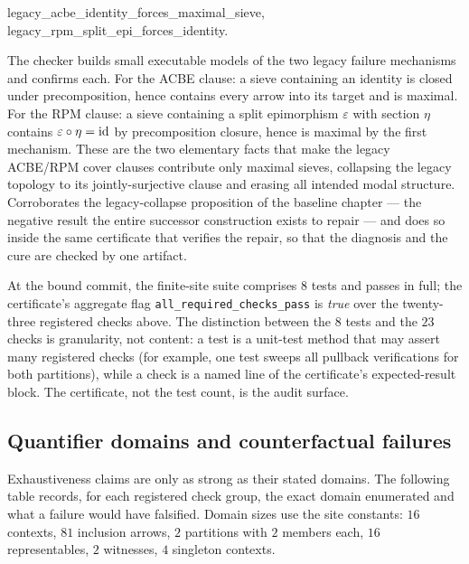 \begin{checkclass}
\label{ch11:chk:legacycollapse}
\begin{center}
\ttfamily
legacy\_acbe\_identity\_forces\_maximal\_sieve,\\
legacy\_rpm\_split\_epi\_forces\_identity.
\end{center}
\noindent The checker builds small
executable models of the two legacy failure mechanisms and confirms each.
For the ACBE clause: a sieve containing an identity is closed under
precomposition, hence contains every arrow into its target and is maximal.
For the RPM clause: a sieve containing a split epimorphism
$\varepsilon$ with section $\eta$ contains $\varepsilon \circ \eta = \mathrm{id}$ by
precomposition closure, hence is maximal by the first mechanism. These are
the two elementary facts that make the legacy ACBE/RPM cover clauses
contribute only maximal sieves, collapsing the legacy topology to its
jointly-surjective clause and erasing all intended modal structure.
Corroborates the legacy-collapse proposition of the baseline chapter ---
the negative result the entire successor construction exists to repair ---
and does so inside the same certificate that verifies the repair, so that
the diagnosis and the cure are checked by one artifact.
\end{checkclass}

\begin{finding}
\label{ch11:fnd:sitesuite}
At the bound commit, the finite-site suite comprises $8$ tests and passes in
full; the certificate's aggregate flag
\texttt{all\_required\_checks\_pass} is \emph{true} over the twenty-three
registered checks above. The distinction between the $8$ tests and the $23$
checks is granularity, not content: a test is a unit-test method that may
assert many registered checks (for example, one test sweeps all pullback
verifications for both partitions), while a check is a named line of the
certificate's expected-result block. The certificate, not the test count,
is the audit surface.
\end{finding}

\subsection{Quantifier domains and counterfactual failures}
\label{ch11:sec:domains}

Exhaustiveness claims are only as strong as their stated domains. The
following table records, for each registered check group, the exact domain
enumerated and what a failure would have falsified. Domain sizes use the
site constants: $16$ contexts, $81$ inclusion arrows, $2$ partitions with
$2$ members each, $16$ representables, $2$ witnesses, $4$ singleton
contexts.

